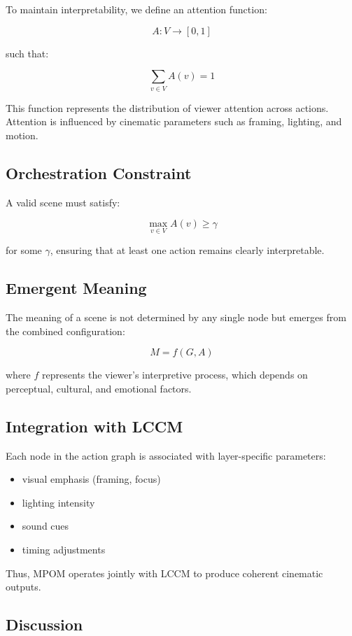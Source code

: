 \documentclass[preprints,article,submit,pdftex,moreauthors,accept]{Definitions/mdpi}
\begin{document}
To maintain interpretability, we define an attention function:

\[
A: V \rightarrow [0,1]
\]

such that:

\[
\sum_{v \in V} A(v) = 1
\]

This function represents the distribution of viewer attention across actions. Attention is influenced by cinematic parameters such as framing, lighting, and motion.

\subsection{Orchestration Constraint}

A valid scene must satisfy:

\[
\max_{v \in V} A(v) \geq \gamma
\]

for some $\gamma$, ensuring that at least one action remains clearly interpretable.

\subsection{Emergent Meaning}

The meaning of a scene is not determined by any single node but emerges from the combined configuration:

\[
M = f(G, A)
\]

where $f$ represents the viewer's interpretive process, which depends on perceptual, cultural, and emotional factors.

\subsection{Integration with LCCM}

Each node in the action graph is associated with layer-specific parameters:

\begin{itemize}
    \item visual emphasis (framing, focus)
    \item lighting intensity
    \item sound cues
    \item timing adjustments
\end{itemize}

Thus, MPOM operates jointly with LCCM to produce coherent cinematic outputs.

\subsection{Discussion}
\end{document}
